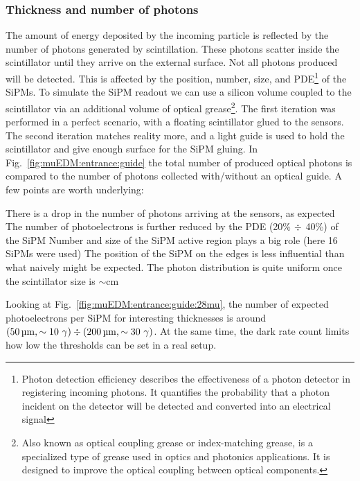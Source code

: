 \begin{refsection}
        \subsubsection{Thickness and number of photons}
            The amount of energy deposited by the incoming particle is reflected by the number of photons generated by scintillation.
            These photons scatter inside the scintillator until they arrive on the external surface.
            Not all photons produced will be detected.
            This is affected by the position, number, size, and PDE\footnote{Photon detection efficiency describes the effectiveness of a photon detector in registering incoming photons. It quantifies the probability that a photon incident on the detector will be detected and converted into an electrical signal} of the SiPMs. 
            To simulate the SiPM readout we can use a silicon volume coupled to the scintillator via an additional volume of optical grease\footnote{Also known as optical coupling grease or index-matching grease, is a specialized type of grease used in optics and photonics applications. It is designed to improve the optical coupling between optical components.}.
            The first iteration was performed in a perfect scenario, with a floating scintillator glued to the sensors.
            The second iteration matches reality more, and a light guide is used to hold the scintillator and give enough surface for the SiPM gluing.
            In Fig.~\ref{fig:muEDM:entrance:guide} the total number of produced optical photons is compared to the number of photons collected with/without an optical guide.
            A few points are worth underlying:
            \begin{outline}
                \1 There is a drop in the number of photons arriving at the sensors, as expected
                \1 The number of photoelectrons is further reduced by the PDE (20\% $\divisionsymbol$ 40\%) of the SiPM
                \1 Number and size of the SiPM active region plays a big role (here 16 SiPMs were used)
                \1 The position of the SiPM on the edges is less influential than what naively might be expected. The photon distribution is quite uniform once the scintillator size is $\sim$cm
            \end{outline}
            Looking at Fig.~\ref{ffig:muEDM:entrance:guide:28mu}, the number of expected photoelectrons per SiPM for interesting thicknesses is around $(\SI{50}{\micro\meter}, \sim10\ \gamma)\divisionsymbol(\SI{200}{\micro\meter}, \sim30\ \gamma)$.
            At the same time, the dark rate count limits how low the thresholds can be set in a real setup.

\end{refsection}
